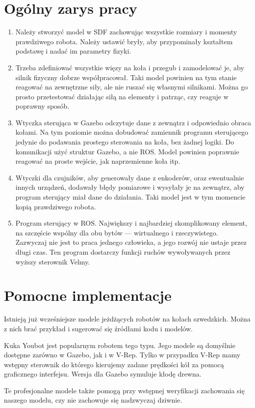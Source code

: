 \section{Ogólny zarys pracy}
\begin{enumerate}
 \item Należy stworzyć model w SDF zachowując wszystkie rozmiary i momenty prawdziwego robota.
Należy ustawić bryły, aby przypominały kształtem podstawę i nadać im parametry fizyki.

\item Trzeba zdefiniować wszystkie więzy na koła i przegub i zamodelować je, aby silnik fizyczny dobrze współpracował.
Taki model powinien na tym stanie reagować na zewnętrzne siły, ale nie ruszać się własnymi silnikami.
Można go prosto przetestować działając siłą na elementy i patrząc, czy reaguje w poprawny sposób.

\item Wtyczka sterująca w Gazebo odczytuje dane z zewnątrz i odpowiednio obraca kołami.
Na tym poziomie można dobudować zamiennik programu sterującego jedynie do podawania prostego sterowania na koła, bez żadnej logiki.
Do komunikacji użyć struktur Gazebo, a nie ROS.
Model powinien poprawnie reagować na proste wejście, jak naprzemienne koła itp.

\item Wtyczki dla czujników, aby generowały dane z enkoderów, oraz ewentualnie innych urządzeń, dodawały błędy pomiarowe i wysyłały je na zewnątrz, aby program sterujący miał dane do działania.
Taki model jest w tym momencie kopią prawdziwego robota.

\item Program sterujący w ROS. Największy i najbardziej skomplikowany element, na szczęście wspólny dla obu bytów --- wirtualnego i rzeczywistego.
Zazwyczaj nie jest to praca jednego człowieka, a jego rozwój nie ustaje przez długi czas.
Ten program dostarczy funkcji ruchów wywoływanych przez wyższy sterownik Velmy.

\end{enumerate}

\section{Pomocne implementacje}
Istnieją już wcześniejsze modele jeżdżących robotów na kołach szwedzkich.
Można z nich brać przykład i sugerować się źródłami kodu i modelów.

Kuka Youbot jest popularnym robotem tego typu. Jego modele są domyślnie dostępne zarówno w Gazebo, jak i w V-Rep.
Tylko w przypadku V-Rep mamy wstępny sterownik do którego kierujemy zadane prędkości kół za pomocą graficznego interfejsu.
Wersja dla Gazebo symuluje kłodę drewna.

Te profesjonalne modele także pomogą przy wstępnej weryfikacji zachowania się naszego modelu, czy nie zachowuje się nadzwyczaj dziwnie.
